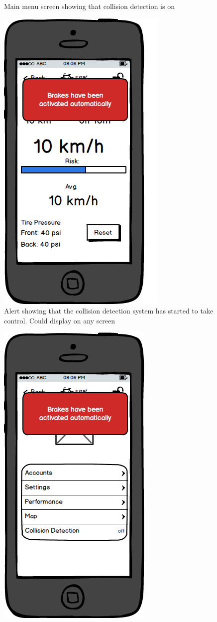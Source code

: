 \documentclass[a4paper]{report}
\begin{document}
{\begin{figure}
\caption{Main menu screen showing that collision detection is on}
\end{figure}
\clearpage
\begin{figure}
\centering
\includegraphics[scale=0.8]{figures/prototype_2/performance_control_alert}
\caption{Alert showing that the collision detection system has started to take control. Could display on any screen}
\end{figure}
\clearpage
\begin{figure}
\centering
\includegraphics[scale=0.8]{figures/prototype_2/main_control_alert}

\end{figure}}
\end{document}
